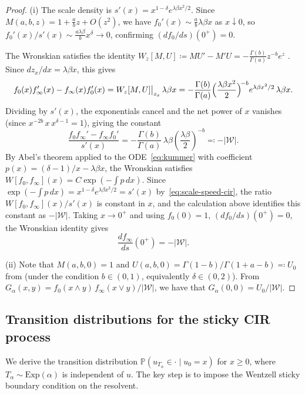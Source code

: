 \documentclass[aap,preprint]{imsart}
\numberwithin{equation}{section}
\theoremstyle{plain}
\theoremstyle{definition}
\begin{document}
\begin{proof}
(i) The scale density is $s'(x) = x^{1-\delta}e^{\lambda\beta x^2/2}$.
  Since $M(a,b,z) = 1 + \frac{a}{b}z + O(z^2)$, we have
  $f_0'(x) \sim \frac{a}{b}\lambda\beta x$ as $x\downarrow 0$, so
  $f_0'(x)/s'(x) \sim \frac{a\lambda\beta}{b}x^\delta \to 0$,
  confirming $(df_0/ds)(0^+) = 0$.

  The Wronskian satisfies the identity $W_z[M,U] \coloneqq MU' - M'U = -\frac{\Gamma(b)}{\Gamma(a)}z^{-b}e^z$
  \cite[\S13.2.34]{Olver2010}. Since $dz_x/dx = \lambda\beta x$, this gives
  \[
    f_0(x) f_\infty'(x) - f_\infty(x) f_0'(x)
    = W_z[M,U]\big|_{z_x} \,  \lambda\beta x
    = -\frac{\Gamma(b)}{\Gamma(a)}
      \Bigl(\frac{\lambda\beta x^2}{2}\Bigr)^{\!-b}
      e^{\lambda\beta x^2/2}\,\lambda\beta x.
  \]
  Dividing by $s'(x)$, the exponentials cancel and the net power of $x$
  vanishes (since $x^{-2b}\,x\,x^{\delta-1} = 1$), giving the constant
  \[
    \frac{f_0 f_\infty' - f_\infty f_0'}{s'(x)}
    = -\frac{\Gamma(b)}{\Gamma(a)}\,\lambda\beta
      \left(\frac{\lambda\beta}{2}\right)^{-b}
    \eqqcolon -|\mathcal{W}|.
  \]
  By Abel's theorem applied to the ODE~\eqref{eq:kummer} with coefficient
  $p(x) = (\delta-1)/x - \lambda\beta x$, the Wronskian satisfies
  $W[f_0,f_\infty](x) = C\exp(-\int p\,dx)$.  Since
  $\exp(-\int p\,dx) = x^{1-\delta}e^{\lambda\beta x^2/2} = s'(x)$
  by~\cref{eq:scale-speed-cir}, the ratio $W[f_0,f_\infty](x)/s'(x)$ is
  constant in $x$, and the calculation above identifies this constant
  as $-|\mathcal{W}|$.
  Taking $x\to 0^+$ and using $f_0(0)=1$, $(df_0/ds)(0^+)=0$, the Wronskian identity gives
  \[
    \frac{df_\infty}{ds}(0^+) = -|\mathcal{W}|.
  \]

  (ii) Note that $M(a,b,0)=1$  and $U(a,b,0)=\Gamma(1-b)/\Gamma(1+a-b)\eqqcolon U_0$ from  \cite[(13.2.2) and (13.2.18)]{Olver2010} (under the condition $b\in(0,1)$, equivalently $\delta\in(0,2)$). From  $G_\alpha(x,y) = f_0(x\wedge y)\,f_\infty(x\vee y)/|\mathcal{W}|$, we have  that
  $G_\alpha(0,0) = U_0/|\mathcal{W}|$. \qedhere
\end{proof}


\subsection{Transition distributions for the sticky CIR process}
\label{transition-sticky-cir}

We derive the transition distribution $\mathbb{P}(u_{T_\alpha}\in\cdot\mid u_0=x)$
for $x\geq 0$, where $T_\alpha\sim\mathrm{Exp}(\alpha)$ is
independent of $u$. The key step is to
impose the Wentzell sticky boundary condition on the resolvent.
\end{document}
